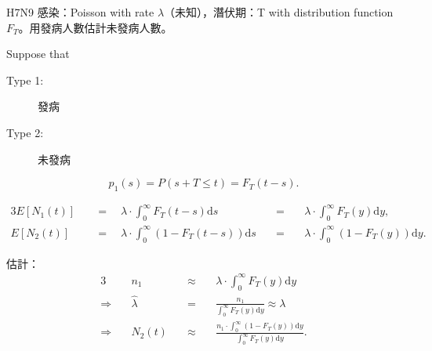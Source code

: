 \begin{example}
H7N9 感染：Poisson with rate $ \lambda $（未知），潛伏期：T with distribution function $ F_{T} $。用發病人數估計未發病人數。

Suppose that
\begin{description}
  \item[Type 1:] 發病
  \item[Type 2:] 未發病
\end{description}
\[ p_{1}(s) = P(s + T \le t) = F_{T}(t - s). \]

\begin{alignat*}{3}
E[N_{1}(t)]
  & \quad=\quad \lambda \cdot \int_{0}^{\infty} F_{T}(t - s) \mathrm{d}s
  & \quad=\quad & \lambda \cdot \int_{0}^{\infty} F_{T}(y) \mathrm{d}y, \\
E[N_{2}(t)]
  & \quad=\quad \lambda \cdot \int_{0}^{\infty} (1 - F_{T}(t - s)) \mathrm{d}s
  & \quad=\quad & \lambda \cdot \int_{0}^{\infty} (1 - F_{T}(y)) \mathrm{d}y.
\end{alignat*}

估計：
\begin{alignat*}{3}
  & n_{1} & \quad\approx\quad & \lambda \cdot \int_{0}^{\infty} F_{T}(y) \mathrm{d}y \\
\Rightarrow\quad
  & \hat{\lambda} & \quad=\quad & \frac{n_{1}}{\int_{0}^{\infty} F_{T}(y) \mathrm{d}y} \approx \lambda \\
\Rightarrow\quad
  & N_{2}(t) & \quad\approx\quad & \frac{n_{1} \cdot \int_{0}^{\infty} (1 - F_{T}(y)) \mathrm{d}y}{\int_{0}^{\infty} F_{T}(y) \mathrm{d}y}.
\end{alignat*}

\end{example}
